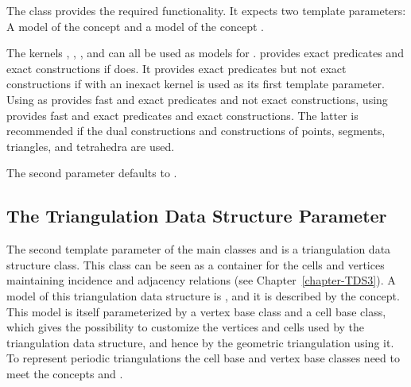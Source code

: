 The class 
provides the required functionality. It expects two template
parameters: A model of the concept 
and a model of the concept .

The kernels , ,
,  and
 can all be used as models for
.  provides exact
predicates and exact constructions if  does. It provides
exact predicates but not exact constructions if
 with  an inexact kernel is used as
its first template parameter. Using
 as
 provides fast and exact predicates and not exact constructions,
using  provides
fast and exact predicates and exact constructions. The latter is recommended if
the dual constructions and constructions of points, segments,
triangles, and tetrahedra are used.

The second parameter  defaults to
.

\subsection{The Triangulation Data Structure Parameter\label{P3Triangulation3-sec-tds}}

The second template parameter of the main classes
 and
 is a
triangulation data structure class.  This class can be seen as a container for
the cells and vertices maintaining incidence and adjacency relations (see
Chapter~\ref{chapter-TDS3}).  A model of this triangulation data structure is
, and it is described by the
 concept.  This model is itself
parameterized by a vertex base class and a cell base class, which gives the
possibility to customize the vertices and cells used by the triangulation data
structure, and hence by the geometric triangulation using it.
To represent periodic triangulations the cell base and vertex base
classes need to meet the concepts
 and
.

